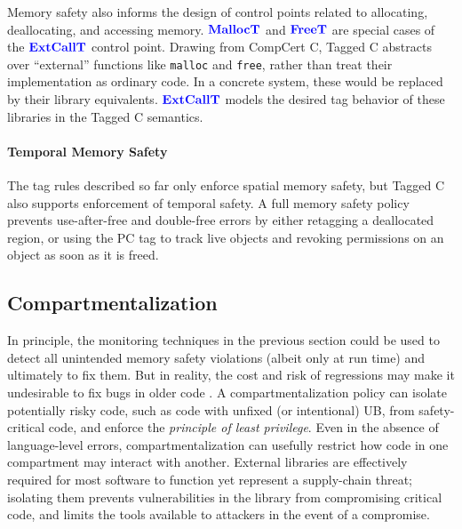 \documentclass{llncs}
\begin{document}
Memory safety also informs the design of control points related to allocating, deallocating, and
accessing memory. \(\color{blue} \mathbf{MallocT}\) and \(\color{blue} \mathbf{FreeT}\) are special cases of the
\(\color{blue} \mathbf{ExtCallT}\) control point. Drawing from CompCert C, Tagged C abstracts over
``external'' functions like {\tt malloc} and {\tt free}, rather than treat their implementation as
ordinary code. In a concrete system, these would be replaced by their library equivalents.
\(\color{blue} \mathbf{ExtCallT}\) models the desired tag behavior of these libraries in the Tagged C semantics.

\paragraph*{Temporal Memory Safety}

The tag rules described so far only enforce spatial memory safety, but Tagged C also
supports enforcement of temporal safety. A full memory safety policy prevents use-after-free and
double-free errors by either retagging a deallocated region, or using the PC tag
to track live objects and revoking permissions on an object as soon as it is freed.

\subsection{Compartmentalization}
\label{sec:compartments}

In principle, the monitoring techniques in the previous section could be used
to detect all unintended memory safety violations (albeit only at run time) and ultimately to fix them.
But in reality, the cost and risk of regressions may make it
undesirable to fix bugs in older code \cite{Bessey10:Coverity}.  
%
A compartmentalization policy can isolate potentially risky code, such as code with unfixed
(or intentional) UB, from safety-critical code, and enforce the {\em principle of least privilege}. 
Even in the absence of language-level errors, compartmentalization can usefully 
restrict how code in one compartment may interact with another. External libraries are
effectively required for most software to function yet represent a supply-chain threat; isolating 
them prevents vulnerabilities in the library from compromising critical code,
and limits the tools available to attackers in the event of a compromise.
\end{document}

